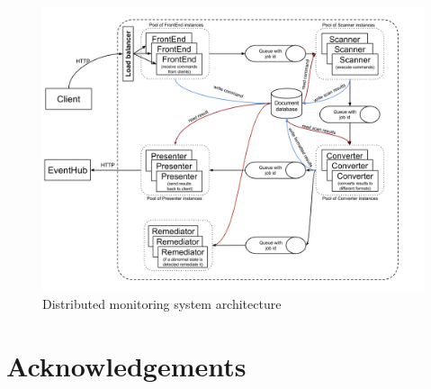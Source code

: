 \documentclass[fleqn,10pt]{./class/wlscirep}
\begin{document}
\begin{figure}[ht]
\centering
\includegraphics[width=\linewidth]{./img/MonitoringSystemArchitecture Remediation.png}
\caption{Distributed monitoring system architecture}
\label{fig:systemArchitecture}
\end{figure}





\section*{Acknowledgements}
\end{document}
